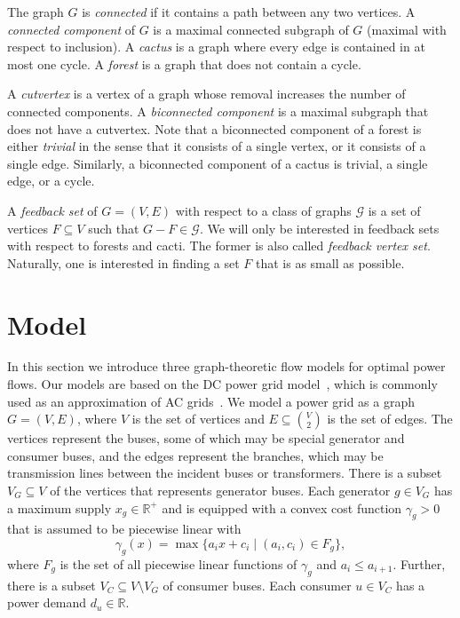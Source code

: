 \documentclass{article}[11pt,a4paper]
\begin{document}
The graph $G$ is \emph{connected} if it contains a path between any
two vertices.  A \emph{connected component} of $G$ is a maximal
connected subgraph of $G$ (maximal with respect to inclusion).  A
\emph{cactus} is a graph where every edge is contained in at most one
cycle.  A \emph{forest} is a graph that does not contain a cycle.

A \emph{cutvertex} is a vertex of a graph whose removal increases the
number of connected components.  A \emph{biconnected component} is a
maximal subgraph that does not have a cutvertex.  Note that a
biconnected component of a forest is either \emph{trivial} in the
sense that it consists of a single vertex, or it consists of a single
edge.  Similarly, a biconnected component of a cactus is trivial, a
single edge, or a cycle.

A \emph{feedback set} of $G = (V,E)$ with respect to a class of graphs
$\mathcal G$ is a set of vertices $F \subseteq V$ such that $G-F \in
\mathcal G$.  We will only be interested in feedback sets with respect
to forests and cacti.  The former is also called \emph{feedback vertex
  set}.  Naturally, one is interested in finding a set $F$ that is as
small as possible.
\section{Model}
\label{sec:model}
In this section we introduce three graph-theoretic flow models for optimal power flows.
Our models are based on the DC power grid model~\cite{Hammerstrom2007, Zimmerman2011a,sja-dcpfr-09}, which is commonly used as an approximation of AC grids~\cite{Purchala2005,ocs-acdc-04}.
We model a power grid as a graph $G = (V, E)$, where $V$ is the set of vertices and $E\subseteq \binom{V}{2}$ is the set of edges. The vertices represent the buses, some of which may be special generator and consumer buses, and the edges represent the branches, which may be transmission lines between the incident buses or transformers.
There is a subset $V_G \subseteq V$ of the vertices that represents generator buses.
Each generator $g \in V_G$ has a maximum supply $x_g \in \mathbb R^{+}$ and is equipped with a convex cost function $\gamma_g > 0$ that is assumed to be piecewise linear with
\begin{equation}
	\label{eq:generatorcostfunction}	
	\gamma_g(x) = \max\{a_i x + c_i \mid(a_i, c_i)\in F_g\},
\end{equation}
where $F_g$ is the set of all piecewise linear functions of $\gamma_g$ and $a_i\leq a_{i+1}$. 
Further, there is a subset $V_C \subseteq V \setminus V_G$ of consumer buses.
Each consumer $u \in V_C$ has a power demand $d_u \in \mathbb R$.
\end{document}
